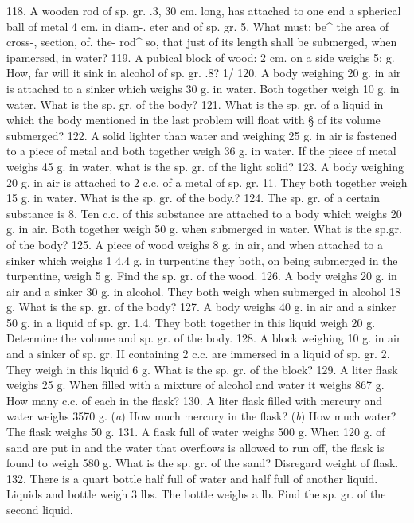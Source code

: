 118. A wooden rod of sp. gr. .3, 30 cm. long, has attached to one end a spherical ball of metal 4 cm. in diam-. eter and of sp. gr. 5. What must; be^ the area of cross-, section, of. the- rod^ so, that just \frac{}{} of its length shall be submerged, when ipamersed, in water?
119. A pubical block of wood: 2 cm. on a side weighs 5; g. How, far will it sink in alcohol of sp. gr. .8? 1/ 
120. A body weighing 20 g. in air is attached to a sinker which weighs 30 g. in water. Both together weigh 10 g. in water. What is the sp. gr. of the body?
121. What is the sp. gr. of a liquid in which the body mentioned in the last problem will float with § of its volume submerged?
122. A solid lighter than water and weighing 25 g. in air is fastened to a piece of metal and both together weigh 36 g. in water. If the piece of metal weighs 45 g. in water, what is the sp. gr. of the light solid?
123. A body weighing 20 g. in air is attached to 2 c.c. of a metal of sp. gr. 11. They both together weigh 15 g. in water. What is the sp. gr. of the body.?
124. The sp. gr. of a certain substance is 8. Ten c.c. of this substance are attached to a body which weighs 20 g. in air. Both together weigh 50 g. when submerged in water. What is the sp.gr. of the body?
125. A piece of wood weighs 8 g. in air, and when attached to a sinker which weighs 1 4.4 g. in turpentine they both, on being submerged in the turpentine, weigh 5 g. Find the sp. gr. of the wood.
126. A body weighs 20 g. in air and a sinker 30 g. in alcohol. They both weigh when submerged in alcohol 18 g. What is the sp. gr. of the body?
127. A body weighs 40 g. in air and a sinker 50 g. in a liquid of sp. gr. 1.4. They both together in this liquid weigh 20 g. Determine the volume and sp. gr. of the body.
128. A block weighing 10 g. in air and a sinker of sp. gr. II containing 2 c.c. are immersed in a liquid of sp. gr. 2. They weigh in this liquid 6 g. What is the sp. gr. of the block?
129. A liter flask weighs 25 g. When filled with a mixture of alcohol and water it weighs 867 g. How many c.c. of each in the flask?
130. A liter flask filled with mercury and water weighs 3570 g. (\emph{a}) How much mercury in the flask? (\emph{b}) How much water? The flask weighs 50 g.
131. A flask full of water weighs 500 g. When 120 g. of sand are put in and the water that overflows is allowed to run off, the flask is found to weigh 580 g. What is the sp. gr. of the sand? Disregard weight of flask.
132. There is a quart bottle half full of water and half full of another liquid. Liquids and bottle weigh 3 lbs. The bottle weighs \frac{}{} a lb. Find the sp. gr. of the second liquid.
